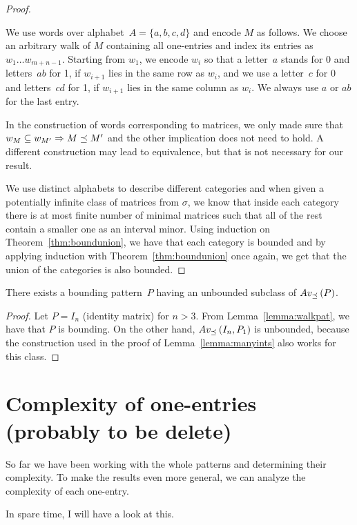 \begin{proof}
\begin{itemize}
		We use words over alphabet~$A=\{a,b,c,d\}$ and encode $M$ as follows. We choose an arbitrary walk of $M$ containing all one-entries and index its entries as $w_1\dots w_{m+n-1}$. Starting from $w_1$, we encode $w_i$ so that a letter~$a$ stands for 0 and letters~$ab$ for 1, if $w_{i+1}$ lies in the same row as $w_i$, and we use a letter~$c$ for 0 and letters~$cd$ for 1, if $w_{i+1}$ lies in the same column as $w_i$. We always use $a$ or $ab$ for the last entry.
\end{itemize}

In the construction of words corresponding to matrices, we only made sure that $w_M\subseteq w_{M'}\Rightarrow M\preceq M'$ and the other implication does not need to hold. A different construction may lead to equivalence, but that is not necessary for our result.

We use distinct alphabets to describe different categories and when given a potentially infinite class of matrices from $\sigma$, we know that inside each category there is at most finite number of minimal matrices such that all of the rest contain a smaller one as an interval minor. Using induction on Theorem~\ref{thm:boundunion}, we have that each category is bounded and by applying induction with Theorem~\ref{thm:boundunion} once again, we get that the union of the categories is also bounded.
\end{proof}

\begin{obs}
There exists a bounding pattern~$P$ having an unbounded subclass of $Av_{\preceq}\left(P\right)$.
\end{obs}
\begin{proof}
Let $P=I_n$ (identity matrix) for $n>3$. From Lemma~\ref{lemma:walkpat}, we have that $P$ is bounding. On the other hand, $Av_{\preceq}\left(I_n,P_1\right)$ is unbounded, because the construction used in the proof of Lemma~\ref{lemma:manyints} also works for this class.
\end{proof}

\section{Complexity of one-entries (probably to be delete)}
So far we have been working with the whole patterns and determining their complexity. To make the results even more general, we can analyze the complexity of each one-entry.

In spare time, I will have a look at this. 

